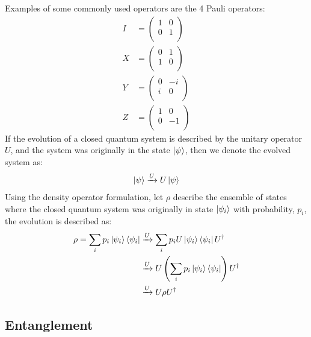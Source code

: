 Examples of some commonly used operators are the 4 Pauli operators:
\begin{align}
    I &= \begin{pmatrix}
        1 & 0 \\ 
        0 & 1 \\ 
    \end{pmatrix} \\ 
    X &= \begin{pmatrix}
        0 & 1 \\ 
        1 & 0 \\ 
    \end{pmatrix} \\ 
    Y &= \begin{pmatrix}
        0 & -i \\ 
        i & 0 \\ 
    \end{pmatrix} \\ 
    Z &= \begin{pmatrix}
        1 & 0 \\ 
        0 & -1 \\ 
    \end{pmatrix}
\end{align}
If the evolution of a closed quantum system is described by the unitary operator $U$, and the system was originally in the state $\ket{\psi}$, then we denote the evolved system as:
\begin{align}
    \ket{\psi} \xrightarrow{U} U \ket{\psi}
\end{align}
Using the density operator formulation, let $\rho$ describe the ensemble of states where the closed quantum system was originally in state $\ket{\psi_i}$ with probability, $p_i$, the evolution is described as:
\begin{align}
    \rho = \sum_i p_i \ket{\psi_i}\bra{\psi_i} &\xrightarrow{U} \sum_i p_i U\ket{\psi_i}\bra{\psi_i}U^{\dagger} \\
    &\xrightarrow{U} U \left(\sum_i p_i \ket{\psi_i}\bra{\psi_i} \right)U^{\dagger} \\
    &\xrightarrow{U} U \rho U^{\dagger}
\end{align}

\subsection{Entanglement}
\label{ssec:entanglement}

